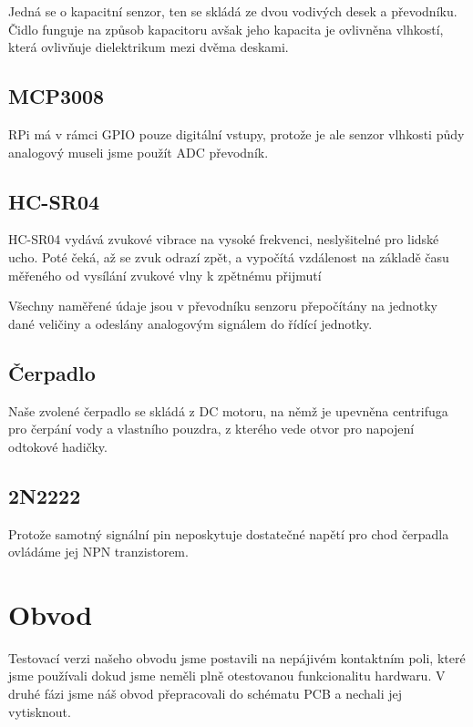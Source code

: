 \documentclass[11pt,a4paper]{article}
\begin{document}
Jedná se o kapacitní senzor, ten se skládá ze dvou vodivých desek a převodníku.
Čidlo funguje na způsob kapacitoru avšak jeho kapacita je ovlivněna vlhkostí,
která ovlivňuje dielektrikum mezi dvěma deskami.

\subsection{MCP3008}

RPi má v rámci GPIO pouze digitální vstupy, protože je ale senzor vlhkosti půdy
analogový museli jsme použít ADC převodník.

\subsection{HC-SR04}

HC-SR04 vydává zvukové vibrace na vysoké frekvenci, neslyšitelné pro lidské
ucho. Poté čeká, až se zvuk odrazí zpět, a vypočítá vzdálenost na základě času
měřeného od vysílání zvukové vlny k zpětnému přijmutí

Všechny naměřené údaje jsou v převodníku senzoru přepočítány na jednotky dané
veličiny a odeslány analogovým signálem do řídící jednotky.

\subsection{Čerpadlo}

Naše zvolené čerpadlo se skládá z DC motoru, na němž je upevněna centrifuga pro
čerpání vody a vlastního pouzdra, z kterého vede otvor pro napojení odtokové
hadičky.

\subsection{2N2222}

Protože samotný signální pin neposkytuje dostatečné napětí pro chod čerpadla
ovládáme jej NPN tranzistorem.

\clearpage

\section{Obvod}

Testovací verzi našeho obvodu jsme postavili na nepájivém kontaktním poli,
které jsme používali dokud jsme neměli plně otestovanou funkcionalitu hardwaru.
V druhé fázi jsme náš obvod přepracovali do schématu PCB a nechali jej
vytisknout.
\end{document}
